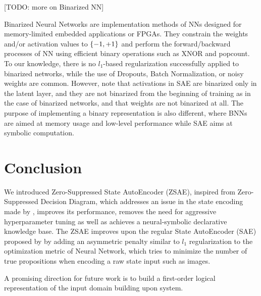 [TODO: more on Binarized NN]

Binarized Neural Networks \cite{courbariaux2015binaryconnect,HubaraCSEB16,rastegari2016xnor}
 are implementation methods of NNs designed for
memory-limited embedded applications or FPGAs. They constrain the weights and/or activation
values to ${\left\{-1,+1\right\}}$ and perform the forward/backward processes of NN using
efficient binary operations such as XNOR and popcount.
To our knowledge, there is no $l_1$-based regularization successfully
applied to binarized networks, while the use of Dropouts, Batch Normalization, 
or noisy weights \cite{HubaraCSEB16} are common.
However, note that activations in SAE are binarized only in the latent layer,
and they are not binarized from the beginning of training
 as in the case of binarized networks, and that weights are not binarized at all.
The purpose of implementing a binary representation is also different, where BNNs
are aimed at memory usage and low-level performance while SAE aims at symbolic computation.

\section{Conclusion}
\label{conclusion}

We introduced Zero-Suppressed State AutoEncoder (ZSAE), inspired from
Zero-Suppressed Decision Diagram, which addresses an issue in the state
encoding made by \latentplanner, improves its performance, removes the need
for aggressive hyperparameter tuning as well as achieves a
neural-symbolic declarative knowledge base.  The ZSAE improves upon the
regular State AutoEncoder (SAE) proposed by \citeauthor{Asai2018} by
adding an asymmetric penalty similar to $l_1$ regularization to the optimization metric of
Neural Network, which tries to minimize the number of true propositions
when encoding a raw state input such as images.

A promising direction for future work is to build a first-order logical
representation of the input domain building upon \latentplanner system.

